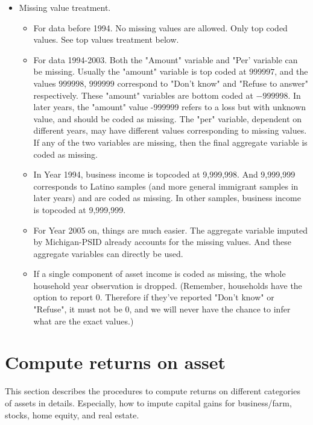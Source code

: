 \documentclass[12pt,notitlepage]{article}%
\begin{document}
\begin{itemize}
\item Missing value treatment.
\begin{itemize}
\item For data before 1994. No missing values are allowed. Only top coded values. See top values treatment below.
\item For data 1994-2003. Both the "Amount" variable and "Per' variable can be missing. Usually the "amount" variable is top coded at $999997$, and the values $999998$, $999999$ correspond to "Don't know" and "Refuse to answer" respectively. These "amount" variables are bottom coded at $-999998$. In later years, the "amount" value -999999 refers to a loss but with unknown value, and should be coded as missing. The "per" variable, dependent on different years, may have different values corresponding to missing values. If any of the two variables are missing, then the final aggregate variable is coded as missing.
\item In Year 1994, business income is topcoded at 9,999,998. And 9,999,999 corresponds to Latino samples (and more general immigrant samples in later years) and are coded as missing. In other samples, business income is topcoded at 9,999,999.
\item For Year 2005 on, things are much easier. The aggregate variable imputed by Michigan-PSID already accounts for the missing values. And these aggregate variables can directly be used.
\item If a single component of asset income is coded as missing, the whole household year observation is dropped. (Remember, households have the option to report 0. Therefore if they've reported "Don't know" or "Refuse", it must not be 0, and we will never have the chance to infer what are the exact values.)
\end{itemize}
\end{itemize}

\section{Compute returns on asset}
This section describes the procedures to compute returns on different categories of assets in details. Especially, how to impute capital gains for business/farm, stocks, home equity, and real estate.
\end{document}
